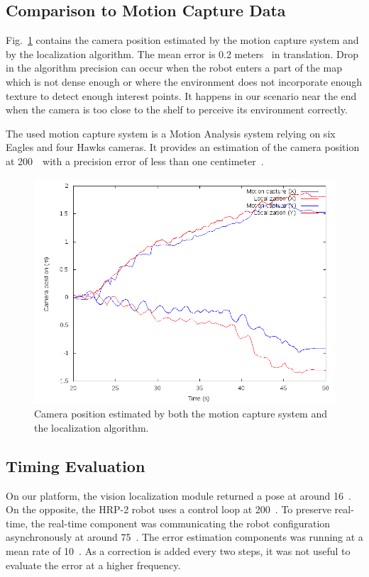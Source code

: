 \subsection{Comparison to Motion Capture Data}\label{sec:mocap}
Fig.~\ref{tab:mocap_comparison} contains the camera position estimated by the motion capture system and by the localization algorithm. The mean error is 0.2 meters~ in translation. Drop in the algorithm precision can occur when the robot enters a part of the map which is not dense enough or where the environment does not incorporate enough texture to detect enough interest points. It happens in our scenario near the end when the camera is too close to the shelf to perceive its environment correctly.

The used motion capture system is a Motion Analysis system relying on six Eagles and four Hawks cameras. It provides an estimation of the camera position at 200~\hertz~with a precision error of less than one centimeter~.
%
\begin{figure}[ht!]
  \begin{center}
    \includegraphics[width=\linewidth]{data/mocap.png}
  \end{center}
  \caption{Camera position estimated by both the motion capture system
    and the localization algorithm. \label{tab:mocap_comparison}}
\end{figure}
%
\subsection{Timing Evaluation}\label{sec:timing}
On our platform, the vision localization module returned a pose at around 16~\hertz. On the opposite, the HRP-2 robot uses a control loop at 200~\hertz. To preserve real-time, the real-time component was
communicating the robot configuration asynchronously at around 75~\hertz. The error estimation components was running at a mean rate of 10~\hertz. As a correction is added every two steps, it was not
useful to evaluate the error at a higher frequency.

